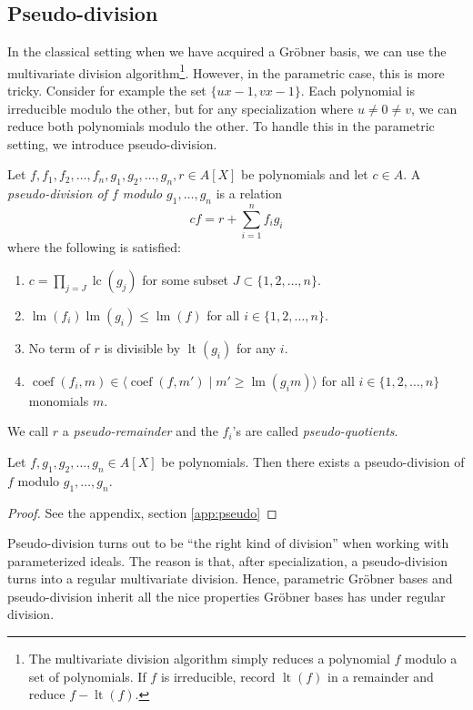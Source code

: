 \documentclass[a4paper, 12pt]{article}
\DeclareMathOperator{\LT}{lt}
\DeclareMathOperator{\LM}{lm}
\DeclareMathOperator{\LC}{lc}
\DeclareMathOperator{\coef}{coef}
\theoremstyle{changedot}
\theoremstyle{changedotbreak}
\theoremstyle{nonumberplain}
\newtheorem{proof}{Proof}
\begin{document}
\subsection{Pseudo-division}
In the classical setting when we have acquired a Gröbner basis, we can use the multivariate division algorithm\footnote{The multivariate division algorithm simply reduces a polynomial $f$ modulo a set of polynomials. If $f$ is irreducible, record $\LT(f)$ in a remainder and reduce $f - \LT(f)$.}. However, in the parametric case, this is more tricky. Consider for example the set $\{ux - 1, vx - 1\}$. Each polynomial is irreducible modulo the other, but for any specialization where $u \neq 0 \neq v$, we can reduce both polynomials modulo the other. To handle this in the parametric setting, we introduce pseudo-division.

\begin{definition}
  Let $f, f_{1}, f_{2}, \dots, f_{n}, g_{1}, g_{2}, \dots, g_{n}, r \in A[X]$ be polynomials and let $c \in A$. A \textit{pseudo-division of $f$ modulo $g_{1}, \dots, g_{n}$} is a relation
  \[cf = r + \sum_{i=1}^{n} f_{i}g_{i}\]
  where the following is satisfied:
  \begin{enumerate}
    \item $c = \prod_{j=J} \LC(g_{j})$ for some subset $J \subset \{1, 2, \dots, n\}$.
    \item $\LM(f_{i})\LM(g_{i}) \leq \LM(f)$ for all $i \in \{1, 2, \dots, n\}$.
    \item No term of $r$ is divisible by $\LT(g_{i})$ for any $i$.
    \item $\coef(f_{i}, m) \in \langle \coef(f, m') \mid m' \geq \LM(g_{i}m) \rangle$ for all $i \in \{1, 2, \dots, n\}$ monomials $m$.
  \end{enumerate}
  We call $r$ a \textit{pseudo-remainder} and the $f_{i}$'s are called \textit{pseudo-quotients}.
\end{definition}


\begin{theorem}\label{thm:exi_pseudo}
  Let $f, g_{1}, g_{2}, \dots, g_{n} \in A[X]$ be polynomials. Then there exists a pseudo-division of $f$ modulo $g_{1}, \dots, g_{n}$.
\end{theorem}
\begin{proof}
  See the appendix, section \ref{app:pseudo}
\end{proof}

Pseudo-division turns out to be ``the right kind of division'' when working with parameterized ideals. The reason is that, after specialization, a pseudo-division turns into a regular multivariate division. Hence, parametric Gröbner bases and pseudo-division inherit all the nice properties Gröbner bases has under regular division.
\end{document}
